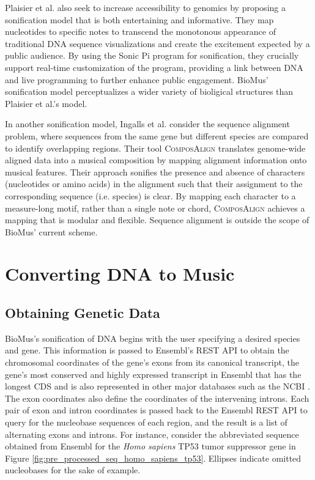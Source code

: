 \documentclass[letterpaper]{article}
\begin{document}
Plaisier et al. also seek to increase accessibility to genomics by proposing a sonification model that is both entertaining and informative. They map nucleotides to specific notes to transcend the monotonous appearance of traditional DNA sequence visualizations and create the excitement expected by a public audience. By using the Sonic Pi program for sonification, they crucially support real-time customization of the program, providing a link between DNA and live programming to further enhance public engagement. BioMus' sonification model perceptualizes a wider variety of bioligical structures than Plaisier et al.'s model.%

In another sonification model, Ingalls et al. consider the sequence alignment problem, where sequences from the same gene but different species are compared to identify overlapping regions. Their tool \textsc{ComposAlign} translates genome-wide aligned data into a musical composition by mapping alignment information onto musical features. Their approach sonifies the presence and absence of characters (nucleotides or amino acids) in the alignment such that their assignment to the corresponding sequence (i.e. species) is clear. By mapping each character to a measure-long motif, rather than a single note or chord, \textsc{ComposAlign} achieves a mapping that is modular and flexible. Sequence alignment is outside the scope of BioMus' current scheme. %

\section{Converting DNA to Music}
\subsection{Obtaining Genetic Data}
BioMus's sonification of DNA begins with the user specifying a desired species and gene. This information is passed to Ensembl's REST API to obtain the chromosomal coordinates of the gene's exons from its canonical transcript, the gene's most conserved and highly expressed transcript in Ensembl that has the longest CDS and is also represented in other major databases such as the NCBI \cite{ensembl_transcript_flags}. The exon coordinates also define the coordinates of the intervening introns. Each pair of exon and intron coordinates is passed back to the Ensembl REST API to query for the nucleobase sequences of each region, and the result is a list of alternating exons and introns. For instance, consider the abbreviated sequence obtained from Ensembl for the \textit{Homo sapiens} TP53 tumor suppressor gene in Figure \ref{fig:pre_processed_seq_homo_sapiens_tp53}. Ellipses indicate omitted nucleobases for the sake of example.
\end{document}
